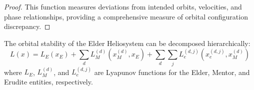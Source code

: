 \begin{proof}
This function measures deviations from intended orbits, velocities, and phase relationships, providing a comprehensive measure of orbital configuration discrepancy.
\end{proof}

\begin{theorem}
The orbital stability of the Elder Heliosystem can be decomposed hierarchically:
\begin{equation}
L(x) = L_E(x_E) + \sum_d L_M^{(d)}(x_M^{(d)}, x_E) + \sum_d \sum_j L_e^{(d,j)}(x_e^{(d,j)}, x_M^{(d)})
\end{equation}
where $L_E$, $L_M^{(d)}$, and $L_e^{(d,j)}$ are Lyapunov functions for the Elder, Mentor, and Erudite entities, respectively.
\end{theorem}

